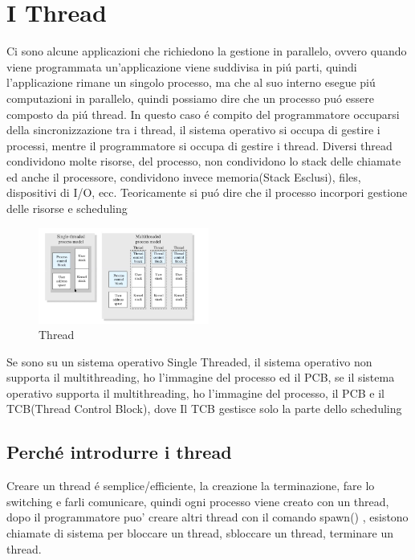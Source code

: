 \section{I Thread}
Ci sono alcune applicazioni che richiedono la gestione in parallelo, ovvero quando viene programmata un'applicazione
viene suddivisa in piú parti, quindi l'applicazione rimane un singolo processo, ma che al suo interno esegue
piú computazioni in parallelo, quindi possiamo dire che un processo puó essere composto da piú thread.
In questo caso é compito del programmatore occuparsi della sincronizzazione tra i thread, il sistema operativo
si occupa di gestire i processi, mentre il programmatore si occupa di gestire i thread.
Diversi thread condividono molte risorse, del processo, non condividono lo stack delle chiamate ed anche il processore,
condividono invece memoria(Stack Esclusi), files, dispositivi di I/O, ecc.
Teoricamente si puó dire che il processo incorpori gestione delle risorse e scheduling
\begin{figure}[H]
    \centering
    \includegraphics[width=0.5\textwidth]{immagini/thread1}
    \caption{Thread}
\end{figure}
Se sono su un sistema operativo Single Threaded, il sistema operativo non supporta il multithreading, ho l'immagine del processo
ed il PCB, se il sistema operativo supporta il multithreading, ho l'immagine del processo, il PCB e il TCB(Thread Control Block),
dove Il TCB gestisce solo la parte dello scheduling
\subsection{Perché introdurre i thread}
Creare un thread é semplice/efficiente, la creazione la terminazione, fare lo switching e farli comunicare,
quindi ogni processo viene creato con un thread, dopo il programmatore puo' creare altri thread con il comando spawn()
, esistono chiamate di sistema per bloccare un thread, sbloccare un thread, terminare un thread.
